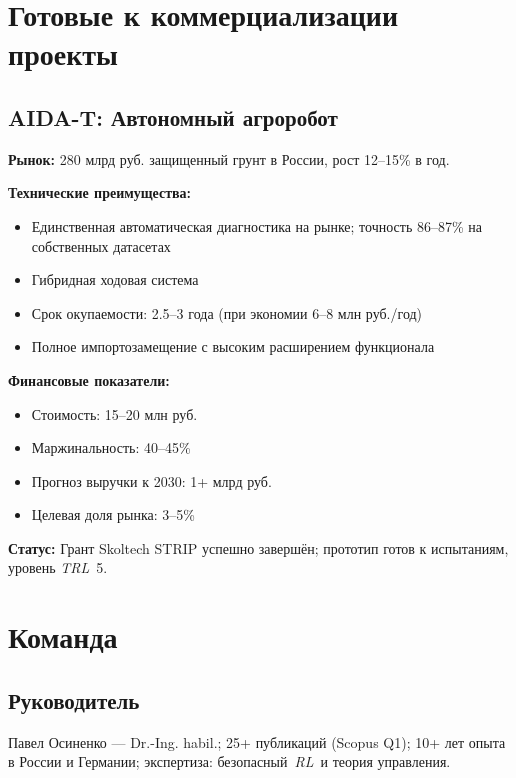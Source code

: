 \documentclass[12pt,a4paper]{article}
\begin{document}
\section{Готовые к коммерциализации проекты}
\subsection{AIDA-T: Автономный агроробот}
\textbf{Рынок:} 280 млрд руб. защищенный грунт в России, рост 12–15\% в год.

\textbf{Технические преимущества:}
\begin{itemize}
    \item Единственная автоматическая диагностика на рынке; точность 86–87\% на собственных датасетах
    \item Гибридная ходовая система
    \item Срок окупаемости: 2.5–3 года (при экономии 6–8 млн руб./год)
    \item Полное импортозамещение с высоким расширением функционала
\end{itemize}

\textbf{Финансовые показатели:}
\begin{itemize}
    \item Стоимость: 15–20 млн руб.
    \item Маржинальность: 40–45\%
    \item Прогноз выручки к 2030: 1+ млрд руб.
    \item Целевая доля рынка: 3–5\%
\end{itemize}
\textbf{Статус:} Грант Skoltech STRIP успешно завершён; прототип готов к испытаниям, уровень \textit{TRL}~5.

\section{Команда}
\subsection*{Руководитель}
Павел Осиненко --- Dr.-Ing. habil.; 25+ публикаций (Scopus Q1); 10+ лет опыта в России и Германии; экспертиза: безопасный~\textit{RL}\ и теория управления. %
\end{document}
